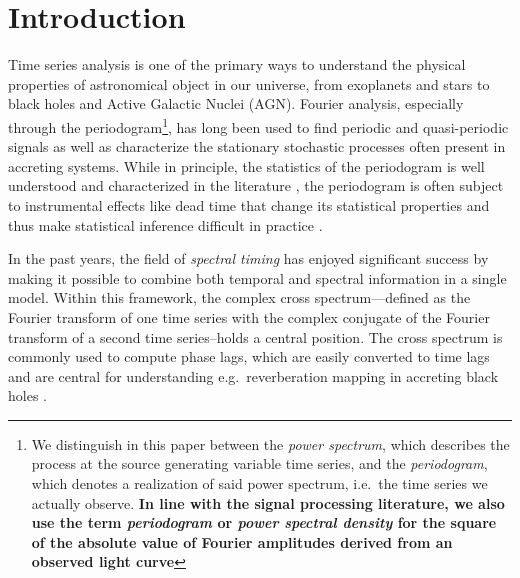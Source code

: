 \documentclass[12pt]{emulateapj}
\begin{document}







\section{Introduction}

Time series analysis is one of the primary ways to understand the physical properties of astronomical object in our universe, from exoplanets and stars to black holes and Active Galactic Nuclei (AGN). 
Fourier analysis, especially through the periodogram\footnote{We distinguish in this paper between the \textit{power spectrum}, which describes the process at the source generating variable time series, and the \textit{periodogram}, which denotes a realization of said power spectrum, i.e.\ the time series we actually observe. \textbf{In line with the signal processing literature, we also use the term \textit{periodogram} or \textit{power spectral density} for the square of the absolute value of Fourier amplitudes derived from an observed light curve}}, has long been used to find periodic and quasi-periodic signals as well as characterize the stationary stochastic processes often present in accreting systems. 
While in principle, the statistics of the periodogram is well understood and characterized in the literature \citep[e.g.][]{vanderklis1989}, the periodogram is often subject to instrumental effects like dead time that change its statistical properties and thus make statistical inference difficult in practice \citep[e.g.][]{Zhang+95}.

In the past years, the field of \textit{spectral timing} has enjoyed significant success by making it possible to combine both temporal and spectral information in a single model. Within this framework, the complex cross spectrum---defined as the Fourier transform of one time series with the complex conjugate of the Fourier transform of a second time series--holds a central position. The cross spectrum is commonly used to compute phase lags, which are easily converted to time lags and are central for understanding e.g.\ reverberation mapping in accreting black holes \citep[see][for a recent review]{uttley2014}. 
\end{document}
